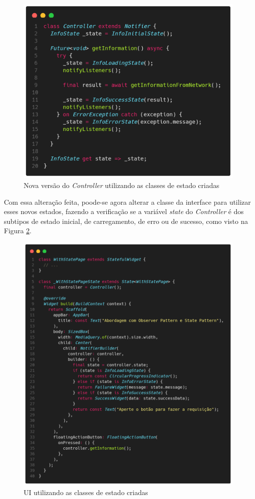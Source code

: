 \documentclass[12pt, %
openright, 
oneside, %
a4paper,    %
brazil]{facom-ufu-abntex2}
\begin{document}
\begin{figure}[ht]
    \centering
    \includegraphics[width=.65\textwidth, trim={0 30 0 100}, clip]{figures/states/controller_with_states.png}
    \caption{Nova versão do \textit{Controller} utilizando as classes de estado criadas}
    \label{fig:controller_with_states}
\end{figure}

Com essa alteração feita, poode-se agora alterar a classe da interface para utilizar esses novos estados, fazendo a verificação se a variável \textit{state} do \textit{Controller} é dos subtipos de estado inicial, de carregamento, de erro ou de sucesso, como visto na Figura \ref{fig:with_state_page}.

\begin{figure}[ht]
    \centering
    \includegraphics[width=.65\textwidth, trim={0 30 0 100}, clip]{figures/states/with_state_page.png}
    \caption{UI utilizando as classes de estado criadas}
    \label{fig:with_state_page}
\end{figure}
\end{document}
